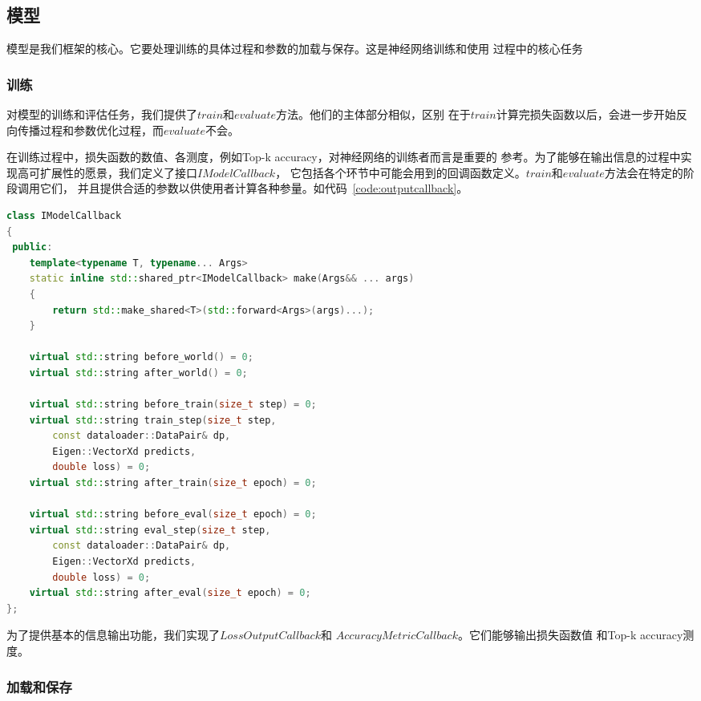 \documentclass[a4paper,twoside,twocolumn]{article}
\begin{document}
\begin{spacing}{1.2}
\subsection{模型}

模型是我们框架的核心。它要处理训练的具体过程和参数的加载与保存。这是神经网络训练和使用
过程中的核心任务

\subsubsection{训练}

对模型的训练和评估任务，我们提供了$train$和$evaluate$方法。他们的主体部分相似，区别
在于$train$计算完损失函数以后，会进一步开始反向传播过程和参数优化过程，而$evaluate$不会。

在训练过程中，损失函数的数值、各测度，例如Top-k accuracy，对神经网络的训练者而言是重要的
参考。为了能够在输出信息的过程中实现高可扩展性的愿景，我们定义了接口$IModelCallback$，
它包括各个环节中可能会用到的回调函数定义。$train$和$evaluate$方法会在特定的阶段调用它们，
并且提供合适的参数以供使用者计算各种参量。如代码~\ref{code:outputcallback}。
\begin{lstlisting}[language=c++,style=CppStyle,caption={接口$IModelCallback$},label={code:outputcallback}]
class IModelCallback
{
 public:
	template<typename T, typename... Args>
	static inline std::shared_ptr<IModelCallback> make(Args&& ... args)
	{
		return std::make_shared<T>(std::forward<Args>(args)...);
	}

	virtual std::string before_world() = 0;
	virtual std::string after_world() = 0;

	virtual std::string before_train(size_t step) = 0;
	virtual std::string train_step(size_t step,
		const dataloader::DataPair& dp,
		Eigen::VectorXd predicts,
		double loss) = 0;
	virtual std::string after_train(size_t epoch) = 0;

	virtual std::string before_eval(size_t epoch) = 0;
	virtual std::string eval_step(size_t step,
		const dataloader::DataPair& dp,
		Eigen::VectorXd predicts,
		double loss) = 0;
	virtual std::string after_eval(size_t epoch) = 0;
};
\end{lstlisting}
为了提供基本的信息输出功能，我们实现了$LossOutputCallback$和
$AccuracyMetricCallback$。它们能够输出损失函数值
和Top-k accuracy测度。

\subsubsection{加载和保存}


\end{spacing}
\end{document}
